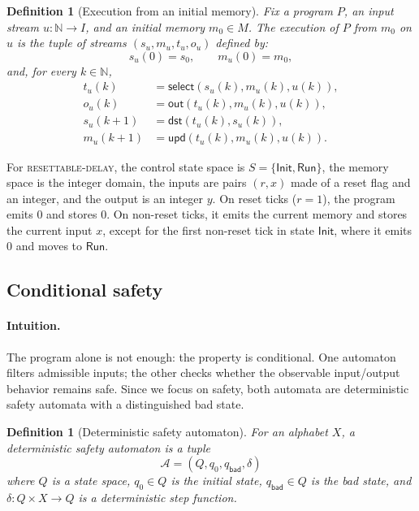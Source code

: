 \documentclass[acmsmall,screen]{acmart}
\theoremstyle{leftplain}
\theoremstyle{leftdefinition}
\newtheorem{definition}[theorem]{Definition}
\theoremstyle{leftremark}
\begin{document}
\begin{definition}[Execution from an initial memory]
Fix a program $P$, an input stream $u : \mathbb{N} \to I$, and an initial
memory $m_0 \in M$. The execution of $P$ from $m_0$ on $u$ is the tuple of
streams $(s_u,m_u,t_u,o_u)$ defined by:
\[
  s_u(0) = s_0,\qquad m_u(0)=m_0,
\]
and, for every $k \in \mathbb{N}$,
\begin{align*}
  t_u(k) &= \mathsf{select}(s_u(k), m_u(k), u(k)),\\
  o_u(k) &= \mathsf{out}(t_u(k), m_u(k), u(k)),\\
  s_u(k+1) &= \mathsf{dst}(t_u(k), s_u(k)),\\
  m_u(k+1) &= \mathsf{upd}(t_u(k), m_u(k), u(k)).
\end{align*}
\end{definition}

\noindent{}
For \textsc{resettable-delay}, the control state space is
$S=\{\mathsf{Init},\mathsf{Run}\}$, the memory space is the integer domain, the
inputs are pairs $(r,x)$ made of a reset flag and an integer, and the output is
an integer $y$. On reset ticks ($r=1$), the program emits $0$ and stores $0$.
On non-reset ticks, it emits the current memory and stores the current input
$x$, except for the first non-reset tick in state $\mathsf{Init}$, where it
emits $0$ and moves to $\mathsf{Run}$.

\subsection{Conditional safety}
\paragraph{Intuition.}
The program alone is not enough: the property is conditional. One automaton
filters admissible inputs; the other checks whether the observable
input/output behavior remains safe. Since we focus on safety, both automata are
deterministic safety automata with a distinguished bad state.

\begin{definition}[Deterministic safety automaton]
For an alphabet $X$, a deterministic safety automaton is a tuple
\[
  \mathcal{A} = (Q,q_0,q_{\mathsf{bad}},\delta)
\]
where $Q$ is a state space, $q_0 \in Q$ is the initial state,
$q_{\mathsf{bad}} \in Q$ is the bad state, and
$\delta : Q \times X \to Q$ is a deterministic step function.
\end{definition}
\end{document}
